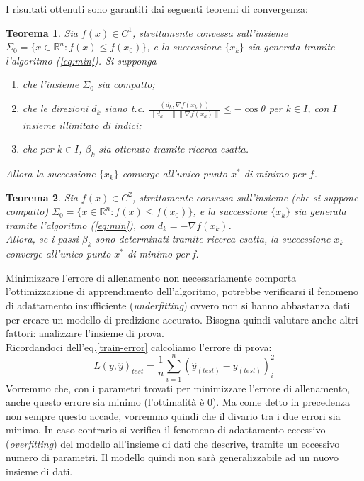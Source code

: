 \documentclass[a4paper,12pt,oneside]{book}
\begin{document}
I risultati ottenuti sono garantiti dai seguenti teoremi di convergenza:
\newtheorem{teo}{Teorema}
\begin{teo}
Sia $f(x)\in C^{1}$, strettamente convessa sull'insieme $\Sigma_{0}=\{x\in\mathbb{R}^{n}:f(x)\leq f(x_{0})\}$, e la successione $\{x_{k}\}$ sia generata tramite l'algoritmo (\ref{eq:min}). Si supponga
\begin{enumerate}
\item che l'insieme $\Sigma_{0}$ sia compatto;
\item che le direzioni $d_{k}$ siano t.c. $\frac{(d_{k},\nabla f(x_{k}))}{\parallel d_{k}\quad \parallel \parallel \nabla f(x_{k})\parallel}\leq - \cos \theta$ per $k\in \textit{I}$, con $\textit{I}$ insieme illimitato di indici;
\item che per $k\in \textit{I}$, $\beta_{k}$ sia ottenuto tramite ricerca esatta.
\end{enumerate}
Allora la successione $\{x_{k}\}$ converge all'unico punto $x^{*}$ di minimo per $f$.
\end{teo}
\begin{teo}
Sia $f(x)\in C^{2}$, strettamente convessa sull'insieme (che si suppone compatto) $\Sigma_{0}=\{x\in\mathbb{R}^{n}:f(x)\leq f(x_{0})\}$, e la successione $\{x_{k}\}$ sia generata tramite l'algoritmo (\ref{eq:min}), con $d_{k}=-\nabla f(x_{k})$.\\
Allora, se i passi $\beta_{k}$ sono determinati tramite ricerca esatta, la successione $x_{k}$ converge all'unico punto $x^{*}$ di minimo per f.
\end{teo}
Minimizzare l'errore di allenamento non necessariamente comporta l'ottimizzazione di apprendimento dell'algoritmo, potrebbe verificarsi il fenomeno di adattamento insufficiente (\textit{underfitting}) ovvero non si hanno abbastanza dati per creare un modello di predizione accurato. Bisogna quindi valutare anche altri fattori: analizzare l'insieme di prova.\\
Ricordandoci dell'eq.\ref{train-error} calcoliamo l'errore di prova:
\begin{equation}\label{test-error}
L(y,\hat{y})_{test}=\frac{1}{n}\sum_{i=1}^{n}(\hat{y}_{(test)}-y_{(test)})_{i}^2
\end{equation}
Vorremmo che, con i parametri trovati per minimizzare l'errore di allenamento, anche questo errore sia minimo (l'ottimalit\`{a} \`e 0). Ma come detto in precedenza non sempre questo accade, vorremmo quindi che il divario tra i due errori sia minimo. In caso contrario si verifica il fenomeno di adattamento eccessivo (\textit{overfitting}) del modello all'insieme di dati che descrive, tramite un eccessivo numero di parametri. Il modello quindi non sar\`{a} generalizzabile ad un nuovo insieme di dati.\\
\end{document}
